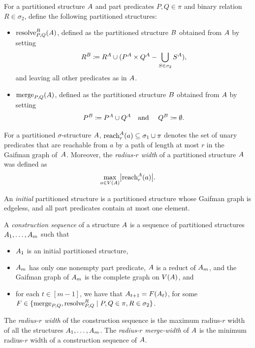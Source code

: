 For a partitioned structure ${{A}}$ and
 part predicates $P,Q\in \pi$ and binary relation $R\in\sigma_2$,
define the following partitioned structures:
\begin{itemize}
\item $\mathrm{resolve}^{R}_{P,Q}({{A}})$, defined as the partitioned structure ${{B}}$ obtained from ${{A}}$ by setting $$R^{{B}}\coloneqq R^{{A}}\cup (P^{{A}}\times Q^{{A}}-\bigcup_{S\in\sigma_2} S^{{A}}),$$ and leaving all other predicates as in ${{A}}$.

\item $\mathrm{merge}_{P,Q}({{A}})$, defined as the partitioned structure ${{B}}$ obtained from ${{A}}$
 by setting $$P^{{{B}}}\coloneqq P^{{{A}}}\cup Q^{{{A}}}\text{\quad and \quad} Q^{{{B}}}\coloneqq\emptyset.$$
\end{itemize}

 For a partitioned $\sigma$-structure ${{A}}$, ${\rm reach}_r^{{{A}}}(a)\subseteq \sigma_1\cup\pi$ denotes the set of unary predicates that are reachable from $a$ by a path of length at most $r$ in the Gaifman graph of~${{A}}$.
Moreover, the \emph{radius-$r$ width} of a partitioned structure ${{A}}$
was defined as $$\max_{a\in V({{A}})}\bigl|{\rm reach}_r^{{{A}}}(a)\bigr|.$$

\begin{definition}
An \emph{initial} partitioned structure
is a partitioned structure whose Gaifman graph is edgeless,
and all part predicates contain at most one element.

  A \emph{construction sequence} of a structure ${{A}}$
  is a sequence of partitioned structures ${{A}}_1,\ldots,{{A}}_m$
  such that
  \begin{itemize}
    \item ${{A}}_1$ is an initial partitioned structure,
    \item ${{A}}_m$ has only one nonempty part predicate,  ${{A}}$ is a reduct of ${{A}}_m$,
    and the Gaifman graph of ${{A}}_m$ is the complete graph on $V({{A}})$,
    and
\item for each $t\in[m-1]$, we have that ${{A}}_{t+1}=F({{A}}_t)$, for
some $F\in\{\mathrm{merge}_{P,Q},\mathrm{resolve}^{R}_{P,Q}\mid P,Q\in\pi,R\in \sigma_2\}$.
  \end{itemize}
  The \emph{radius-$r$ width} of the construction sequence is the maximum
  radius-$r$ width of all the structures ${{A}}_1,\ldots,{{A}}_m$.
  The \emph{radius-$r$ merge-width} of ${{A}}$ is the minimum
  radius-$r$ width of a construction sequence of ${{A}}$.
\end{definition}

